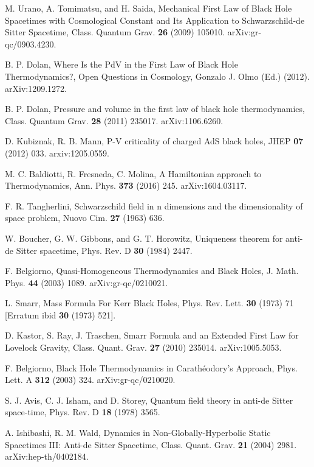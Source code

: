 \documentclass[prd,onecolumn,notitlepage,amsmath,nofootinbib,superscriptaddress,showpacs,showkeys]{revtex4-1}
\begin{document}
\begin{thebibliography}{99}
M. Urano, A. Tomimatsu, and H. Saida, Mechanical First
Law of Black Hole Spacetimes with Cosmological Constant and Its Application
to Schwarzschild-de Sitter Spacetime, Class. Quantum Grav. \textbf{26}
(2009) 105010. arXiv:gr-qc/0903.4230.

B. P. Dolan, Where Is the PdV in the First Law of Black
Hole Thermodynamics?, Open Questions in Cosmology, Gonzalo J. Olmo
(Ed.) (2012). arXiv:1209.1272.

B. P. Dolan, Pressure and volume in the first law of
black hole thermodynamics, Class. Quantum Grav. \textbf{28} (2011)
235017. arXiv:1106.6260.

D. Kubiznak, R. B. Mann, P-V criticality of charged
AdS black holes, JHEP \textbf{07} (2012) 033. arxiv:1205.0559.

M. C. Baldiotti, R. Fresneda, C. Molina,
A Hamiltonian approach to Thermodynamics, Ann. Phys. \textbf{373}
(2016) 245. arXiv:1604.03117.

F. R. Tangherlini, Schwarzschild field in n
dimensions and the dimensionality of space problem, Nuovo Cim. \textbf{27}
(1963) 636.

W. Boucher, G. W. Gibbons, and G. T. Horowitz, Uniqueness
theorem for anti-de Sitter spacetime, Phys. Rev. D \textbf{30} (1984)
2447.

F. Belgiorno, Quasi-Homogeneous Thermodynamics
and Black Holes, J. Math. Phys. \textbf{44} (2003) 1089. arXiv:gr-qc/0210021.

L. Smarr, Mass Formula For Kerr Black Holes, Phys.
Rev. Lett. \textbf{30} (1973) 71 {[}Erratum ibid \textbf{30} (1973)
521{]}.

D. Kastor, S. Ray, J. Traschen, Smarr Formula
and an Extended First Law for Lovelock Gravity, Class. Quant. Grav.
\textbf{27} (2010) 235014. arXiv:1005.5053.

F. Belgiorno, Black Hole Thermodynamics in Carath\'{e}odory's
Approach, Phys. Lett. A \textbf{312} (2003) 324. arXiv:gr-qc/0210020.

S. J. Avis, C. J. Isham, and D. Storey, Quantum field
theory in anti-de Sitter space-time, Phys. Rev. D \textbf{18} (1978)
3565.

A. Ishibashi, R. M. Wald, Dynamics in Non-Globally-Hyperbolic
Static Spacetimes III: Anti-de Sitter Spacetime, Class. Quant. Grav.
\textbf{21} (2004) 2981. arXiv:hep-th/0402184.


\end{thebibliography}
\end{document}
